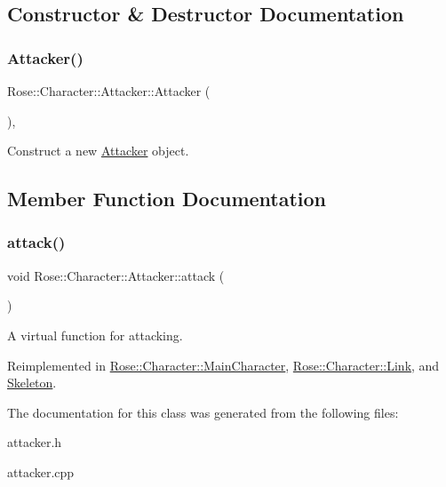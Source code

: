 \subsection{Constructor \& Destructor Documentation}
\mbox{\label{classRose_1_1Character_1_1Attacker_aa36b93fbee8b97bbefbf326b6042e3eb}} 
\subsubsection{\texorpdfstring{Attacker()}{Attacker()}}
{\footnotesize\ttfamily Rose\+::\+Character\+::\+Attacker\+::\+Attacker (\begin{DoxyParamCaption}{ }\end{DoxyParamCaption})\hspace{0.3cm}{\ttfamily [inline]}, {\ttfamily [protected]}}



Construct a new \mbox{\hyperlink{classRose_1_1Character_1_1Attacker}{Attacker}} object. 



\subsection{Member Function Documentation}
\mbox{\label{classRose_1_1Character_1_1Attacker_a49ee8dfa04018f90c7fd5fa20ba4fcad}} 
\subsubsection{\texorpdfstring{attack()}{attack()}}
{\footnotesize\ttfamily void Rose\+::\+Character\+::\+Attacker\+::attack (\begin{DoxyParamCaption}{ }\end{DoxyParamCaption})\hspace{0.3cm}{\ttfamily [virtual]}}



A virtual function for attacking. 



Reimplemented in \mbox{\hyperlink{classRose_1_1Character_1_1MainCharacter_aec29206b632fb2bfe77af3e9f48835b4}{Rose\+::\+Character\+::\+Main\+Character}}, \mbox{\hyperlink{classRose_1_1Character_1_1Link_af22163dcc690bbbfdc9425aff8074766}{Rose\+::\+Character\+::\+Link}}, and \mbox{\hyperlink{classSkeleton_a90927f96174510cebe29d6bb39f4387c}{Skeleton}}.



The documentation for this class was generated from the following files\+:\begin{DoxyCompactItemize}
\item 
attacker.\+h\item 
attacker.\+cpp\end{DoxyCompactItemize}
